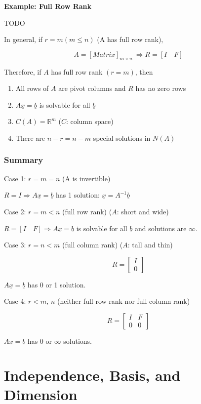 \documentclass[12pt,a4paper]{article}
\begin{document}
\textbf{Example: Full Row Rank}

TODO

In general, if $r = m (m\leq n)$ (A has full row rank), 

\[A = [Matrix]_{m \times n}\ \Rightarrow R = [I \quad F] \]

Therefore, if $A$ has full row rank $(r=m)$, then 
\begin{enumerate}
  \item All rows of $A$ are pivot columns and $R$ has no zero rows
  \item $A\underline{x} = \underline{b}$ is solvable for all $\underline{b}$
  \item $C(A) = \mathbb{R}^m$ ($C$: column space)
  \item There are $n-r = n-m$ special solutions in $N(A)$
\end{enumerate}

\subsubsection*{Summary}

Case 1: $r = m = n$ (A is invertible)

$R = I \Rightarrow A\underline{x} = \underline{b}$ has 1 solution: $\underline{x} = A^{-1}\underline{b}$

Case 2: $r = m < n$ (full row rank) ($A$: short and wide)

$R = [I \quad F] \Rightarrow A\underline{x} = \underline{b}$ is solvable for all $\underline{b}$ and solutions are $\infty$.

Case 3: $r = n < m$ (full column rank) ($A$: tall and thin)

\[
R = 
\begin{bmatrix}
  I \\
  0
\end{bmatrix}
\]

$A\underline{x} = \underline{b}$ has 0 or 1 solution.

Case 4: $r < m,\, n$ (neither full row rank nor full column rank)

\[
R = 
\begin{bmatrix}
  I & F \\
  0 & 0
\end{bmatrix}
\]

$A\underline{x} = \underline{b}$ has 0 or $\infty$ solutions.

\section*{Independence, Basis, and Dimension}
\end{document}
